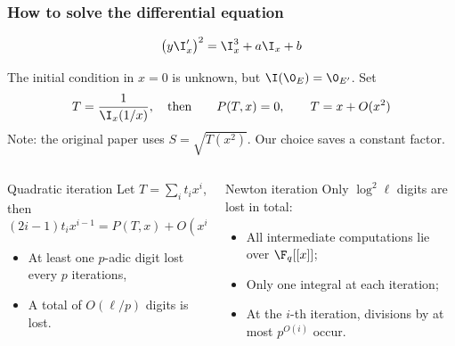 \documentclass[10pt]{beamer}
\renewcommand{\emph}[1]{{\usebeamercolor[fg]{structure}#1}}
\begin{document}
\begin{frame}
  \frametitle{How to solve the differential equation}
  
  \emph{\large\[\left(y\I_x'\right)^2 = \I_x^3 + a\I_x + b\]}

  The initial condition in $x=0$ is unknown, but $\I(\0_E) =
  \0_{E'}$. Set
  \begin{equation*}
    T=\frac{1}{\I_x(1/x)},\quad\text{then}\qquad P(T,x) = 0,\qquad T = x + O(x^2)
  \end{equation*}
  Note: the original paper uses $S=\sqrt{T(x^2)}$. Our choice
  saves a constant factor.
  
  \begin{columns}[t]
    \begin{column}{0.47\textwidth}
      \begin{block}{Quadratic iteration}
        Let $T=\sum_it_ix^i$, then 
        \begin{equation*}
          (2i-1)t_ix^{i-1} =  P(T,x) + O(x^i)
        \end{equation*}

        \begin{itemize}
        \item \alert{At least one $p$-adic digit lost every $p$
            iterations},
        \item A total of \alert{$O(\ell/p)$} digits is lost.
        \end{itemize}
      \end{block}
    \end{column}
    \begin{column}{0.47\textwidth}
      \begin{block}{Newton iteration}
        Only \alert{$\log^2\ell$} digits are lost in total:
        \begin{itemize}
        \item All intermediate computations lie over $\F_q[[x]]$;
        \item Only one integral at each iteration;
        \item \alert{At the $i$-th iteration, divisions by at most
            $p^{O(i)}$ occur.}
        \end{itemize}
      \end{block}
    \end{column}
  \end{columns}
\end{frame}

\end{document}
